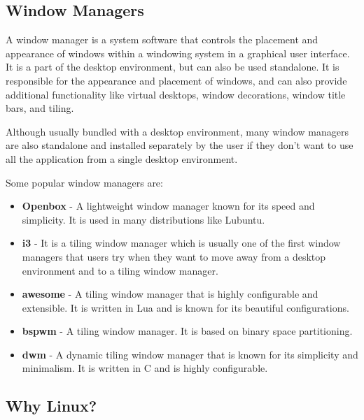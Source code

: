 \subsection{Window Managers}

\begin{definition}
  A window manager is a system software that controls the placement and appearance of windows within a windowing system in a graphical user interface. It is a part of the desktop environment, but can also be used standalone. It is responsible for the appearance and placement of windows, and can also provide additional functionality like virtual desktops, window decorations, window title bars, and tiling.
\end{definition}

Although usually bundled with a desktop environment, many window managers are also standalone and installed separately by the user if they don't want to use all the application from a single desktop environment.

Some popular window managers are:

\begin{itemize}
  \item
    \textbf{Openbox} - A lightweight window manager known for its speed and simplicity. It is used in many distributions like Lubuntu.
  \item
    \textbf{i3} - It is a tiling window manager
    which is usually one of the first window managers that users try when they want to move away from a desktop environment and to a tiling window manager.
  \item \textbf{awesome} - A tiling window manager that is highly configurable and extensible. It is written in Lua and is known for its beautiful configurations.
  \item \textbf{bspwm} - A tiling window manager. It is based on binary space partitioning.
  \item \textbf{dwm} - A dynamic tiling window manager that is known for its simplicity and minimalism. It is written in C and is highly configurable.
  \end{itemize}

\subsection{Why Linux?}

